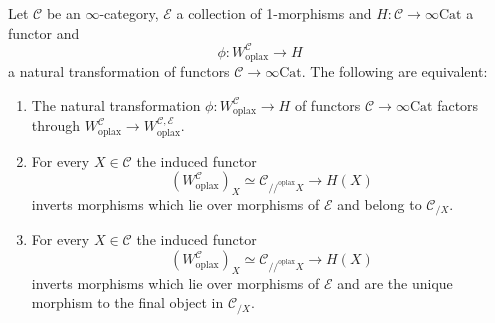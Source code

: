 \documentclass[10pt,oneside]{article}
\numberwithin{equation}{section} %
\numberwithin{figure}{section} %
\theoremstyle{plain}
\theoremstyle{definition}
\newcommand{\mC}{{\mathcal C}}
\newcommand{\mE}{{\mathcal E}}
\newcommand{\W}{W}
\newcommand{\Cat}{\mathrm{Cat}}
\newcommand{\oplax}{{\mathrm{oplax}}}
\begin{document}
\begin{proposition}\label{weichara} Let $\mC$ be an $\infty$-category, $\mE$ a collection of 1-morphisms and $H: \mC \to \infty\Cat$ a functor and
$$ \phi: \W^{\mC}_\oplax \to H $$ a natural transformation of functors $\mC \to \infty\Cat$.
The following are equivalent:

\begin{enumerate}[\normalfont(1)]\setlength{\itemsep}{-2pt}
\item The natural transformation $\phi: \W^{\mC}_\oplax \to H $ of functors $\mC \to \infty\Cat$ 
factors through $\W^{\mC}_\oplax \to \W^{\mC,\mE}_\oplax$.

\item For every $X \in \mC$ the induced functor
$$ (\W^{\mC}_\oplax)_X \simeq \mC_{//^\oplax X} \to H(X) $$ 
inverts morphisms which lie over morphisms of $\mE$ and belong to
$\mC_{/X}.$

\item For every $X \in \mC$ the induced functor
$$ (\W^{\mC}_\oplax)_X \simeq \mC_{//^\oplax X} \to H(X) $$ 
inverts morphisms which lie over morphisms of $\mE$ and are the unique morphism to the final object in $\mC_{/X}.$

\end{enumerate}

\end{proposition}
\end{document}
